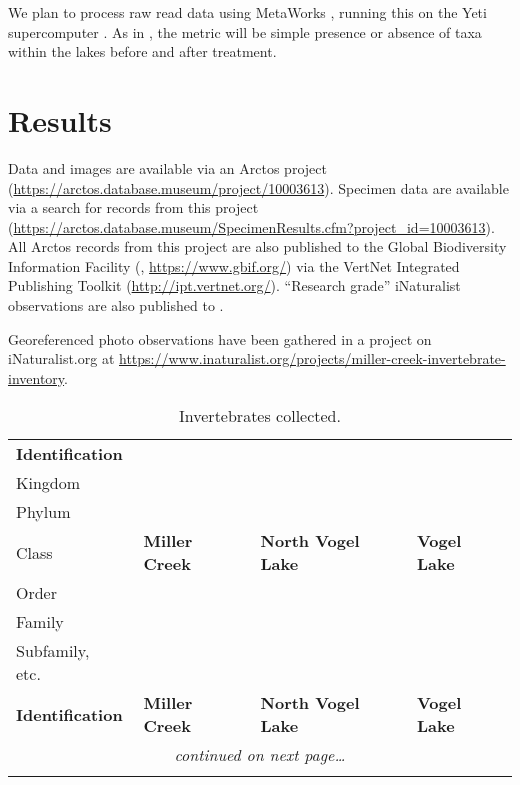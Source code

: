 \begin{multicols}{2}
We plan to process raw read data using MetaWorks \citep{PorterHajibabaei2020}, running this on the Yeti supercomputer \citep{USGSARC2021}. As in \citet{Massengill2014, Massengill2017}, the metric will be simple presence or absence of taxa within the lakes before and after treatment.


\section{Results}

Data and images are available via an Arctos project (\url{https://arctos.database.museum/project/10003613}). Specimen data are available via a search for records from this project (\url{https://arctos.database.museum/SpecimenResults.cfm?project_id=10003613}). All Arctos records from this project are also published to the Global Biodiversity Information Facility (, \url{https://www.gbif.org/}) via the VertNet Integrated Publishing Toolkit (\url{http://ipt.vertnet.org/}). ``Research grade'' iNaturalist observations are also published to .

Georeferenced photo observations have been gathered in a project on iNaturalist.org at \url{https://www.inaturalist.org/projects/miller-creek-invertebrate-inventory}. 

\end{multicols}

\begin{longtable}{p{3in}p{1.2in}p{1.2in}p{1.2in}}
\caption{Invertebrates collected.}\label{tableids}\\

\hline
\hline
\textbf{Identification}&&&\\ 
\hspace{0em}Kingdom&&&\\
\hspace{0.8em}Phylum&&&\\
\hspace{1.6em}Class& \textbf{Miller Creek} & \textbf{North Vogel Lake} & \textbf{Vogel Lake}\\
\hspace{2.4em}Order&&&\\
\hspace{3.2em}Family&&&\\
\hspace{4.0em}Subfamily, etc.\ &&&\\
\hline
\endfirsthead

\hline
\textbf{Identification} & \textbf{Miller Creek} & \textbf{North Vogel Lake} & \textbf{Vogel Lake}\\
\hline
\endhead

\multicolumn{4}{c}{\textit{continued on next page\ldots}}\\
\hline
\endfoot

\hline
\hline
\endlastfoot



\end{longtable}

